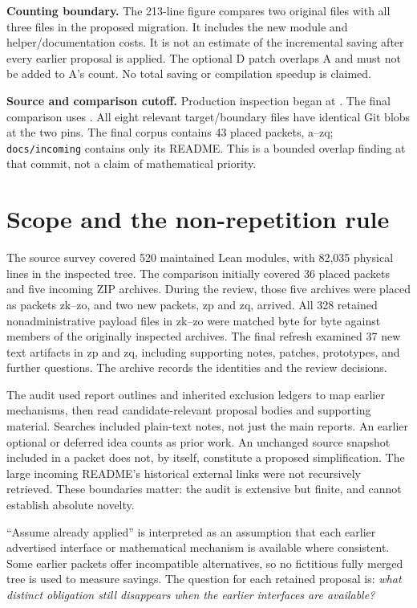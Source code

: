 \documentclass[11pt,a4paper]{article}
\newcommand{\code}[1]{\texttt{\small #1}}
\begin{document}
\textbf{Counting boundary.} The 213-line figure compares two original files with all three files in the proposed migration. It includes the new module and helper/documentation costs. It is not an estimate of the incremental saving after every earlier proposal is applied. The optional D patch overlaps A and must not be added to A's count. No total saving or compilation speedup is claimed.

\textbf{Source and comparison cutoff.} Production inspection began at
.
The final comparison uses
.
All eight relevant target/boundary files have identical Git blobs at the two pins. The final corpus contains 43 placed packets, a--zq; \code{docs/incoming} contains only its README. This is a bounded overlap finding at that commit, not a claim of mathematical priority.

\tableofcontents
\newpage

\section{Scope and the non-repetition rule}

The source survey covered 520 maintained Lean modules, with 82,035 physical lines in the inspected tree. The comparison initially covered 36 placed packets and five incoming ZIP archives. During the review, those five archives were placed as packets zk--zo, and two new packets, zp and zq, arrived. All 328 retained nonadministrative payload files in zk--zo were matched byte for byte against members of the originally inspected archives. The final refresh examined 37 new text artifacts in zp and zq, including supporting notes, patches, prototypes, and further questions. The archive records the identities and the review decisions.

The audit used report outlines and inherited exclusion ledgers to map earlier mechanisms, then read candidate-relevant proposal bodies and supporting material. Searches included plain-text notes, not just the main reports. An earlier optional or deferred idea counts as prior work. An unchanged source snapshot included in a packet does not, by itself, constitute a proposed simplification. The large incoming README's historical external links were not recursively retrieved. These boundaries matter: the audit is extensive but finite, and cannot establish absolute novelty.

``Assume already applied'' is interpreted as an assumption that each earlier advertised interface or mathematical mechanism is available where consistent. Some earlier packets offer incompatible alternatives, so no fictitious fully merged tree is used to measure savings. The question for each retained proposal is: \emph{what distinct obligation still disappears when the earlier interfaces are available?}
\end{document}
